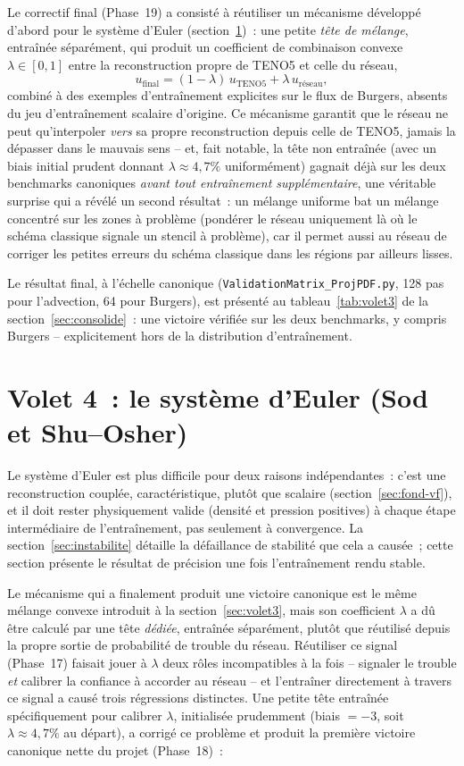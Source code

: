 \documentclass[11pt]{article}
\begin{document}
Le correctif final (Phase~19) a consisté à réutiliser un mécanisme
développé d'abord pour le système d'Euler (section~\ref{sec:volet4})~:
une petite \emph{tête de mélange}, entraînée séparément, qui produit un
coefficient de combinaison convexe $\lambda \in [0,1]$ entre la
reconstruction propre de TENO5 et celle du réseau,
\[
u_{\text{final}} = (1-\lambda)\, u_{\text{TENO5}} + \lambda\, u_{\text{réseau}},
\]
combiné à des exemples d'entraînement explicites sur le flux de Burgers,
absents du jeu d'entraînement scalaire d'origine. Ce mécanisme garantit
que le réseau ne peut qu'interpoler \emph{vers} sa propre reconstruction
depuis celle de TENO5, jamais la dépasser dans le mauvais sens -- et,
fait notable, la tête non entraînée (avec un biais initial prudent
donnant $\lambda \approx 4,7\%$ uniformément) gagnait déjà sur les deux
benchmarks canoniques \emph{avant tout entraînement supplémentaire}, une
véritable surprise qui a révélé un second résultat~: un mélange uniforme
bat un mélange concentré sur les zones à problème (pondérer le réseau
uniquement là où le schéma classique signale un stencil à problème), car
il permet aussi au réseau de corriger les petites erreurs du schéma
classique dans les régions par ailleurs lisses.

Le résultat final, à l'échelle canonique (\texttt{ValidationMatrix\_ProjPDF.py}, 128 pas pour l'advection, 64 pour Burgers), est présenté au
tableau~\ref{tab:volet3} de la section~\ref{sec:consolide}~: une victoire
vérifiée sur les deux benchmarks, y compris Burgers -- explicitement hors
de la distribution d'entraînement.

\section{Volet 4~: le système d'Euler (Sod et Shu--Osher)}
\label{sec:volet4}

Le système d'Euler est plus difficile pour deux raisons indépendantes~:
c'est une reconstruction couplée, caractéristique, plutôt que scalaire
(section~\ref{sec:fond-vf}), et il doit rester physiquement valide
(densité et pression positives) à chaque étape intermédiaire de
l'entraînement, pas seulement à convergence. La section~\ref{sec:instabilite}
détaille la défaillance de stabilité que cela a causée~; cette section
présente le résultat de précision une fois l'entraînement rendu stable.

Le mécanisme qui a finalement produit une victoire canonique est le même
mélange convexe introduit à la section~\ref{sec:volet3}, mais son
coefficient $\lambda$ a dû être calculé par une tête \emph{dédiée},
entraînée séparément, plutôt que réutilisé depuis la propre sortie de
probabilité de trouble du réseau. Réutiliser ce signal (Phase~17) faisait
jouer à $\lambda$ deux rôles incompatibles à la fois -- signaler le
trouble \emph{et} calibrer la confiance à accorder au réseau -- et
l'entraîner directement à travers ce signal a causé trois régressions
distinctes. Une petite tête entraînée spécifiquement pour calibrer
$\lambda$, initialisée prudemment (biais $=-3$, soit $\lambda \approx
4,7\%$ au départ), a corrigé ce problème et produit la première victoire
canonique nette du projet (Phase~18)~:
\end{document}
